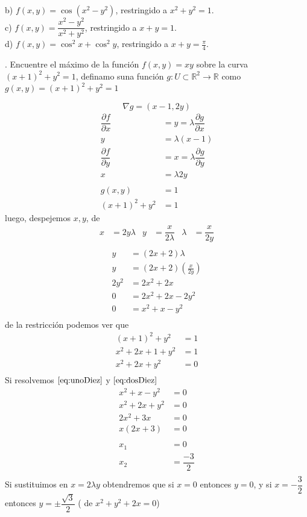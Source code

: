 \documentclass[letterpaper]{article}
\renewcommand{\d}{\partial}
\newcommand{\R}{\mathds{R}}
\renewcommand{\*}{\cdot}
\theoremstyle{definition}
\begin{document}
b) $f(x,y) = \cos{(x^2 - y^2)}{}$, restringido a $x^2 + y^2 =1$.\\

c) $f(x,y) = \dfrac{x^2 - y^2}{x^2 + y^2}$, restringido a $x + y =1$.\\

d) $f(x,y) = \cos^2{x} +\cos^2{y}$, restringido a $x + y =\frac{\pi}{4}$.


. Encuentre el máximo de la función $f(x,y) = xy$ sobre la curva $(x +1)^2 + y^2 =1$, definamo suna función $ g: U \subset \R^2 \to \R $ como $ g(x,y) = (x +1)^2 + y^2 = 1$

\[ \nabla g = (x-1, 2y) \]
\begin{align*}
	\dfrac{\d f}{\d x} &= y = \lambda \dfrac{\d g}{\d x}\\
	y &= \lambda(x - 1) \\
	\dfrac{\d f}{\d y} &= x = \lambda \dfrac{\d g}{\d y}\\
	x &=  \lambda 2y\\
	\\
	g(x,y) &= 1\\
	(x +1)^2 + y^2 &= 1
\end{align*}
luego, despejemos $ x,y $, de
\begin{align*}
	x &= 2y \lambda  & y &= \dfrac{x}{2\lambda} & \lambda &= \dfrac{x}{2y}  \\
\end{align*}
\begin{align*}
	y &= (2x + 2)\lambda\\
	y &= (2x + 2)(\frac{x}{2y})\\
	2y^2 &= 2x^2 + 2x\\
	0 &= 2x^2 + 2x - 2y^2\\
	0 &= x^2 + x - y^2 \label{eq:unoDiez}\tag{10a} \\
\end{align*}
de la restricción podemos ver que 
\begin{align*}
	(x +1)^2 + y^2 &= 1\\
	x^2 + 2x+ 1+ y^2 &= 1\\
	x^2 + 2x+ y^2 &= 0 \label{eq:dosDiez}\tag{10b} \\
\end{align*}
Si resolvemos $ \ref{eq:unoDiez} $ y $ \ref{eq:dosDiez} $ 
\begin{align*}
	x^2 + x - y^2 &= 0\\
	x^2 + 2x+ y^2 &= 0\\
	2x^2 + 3x &= 0\\
	x(2x + 3) &= 0\\
	\\
	x_1 &= 0\\
	x_2 &= \dfrac{-3}{2}\\
\end{align*}
Si sustituimos en $ x = 2\lambda y $ obtendremos que si $ x = 0 $ entonces $ y = 0 $, y si $ x = -\dfrac{3}{2} $ entonces $ y = \pm \dfrac{\sqrt{3}}{2} $ ( de $x^2 + y^2 +2x = 0  $)
\end{document}
